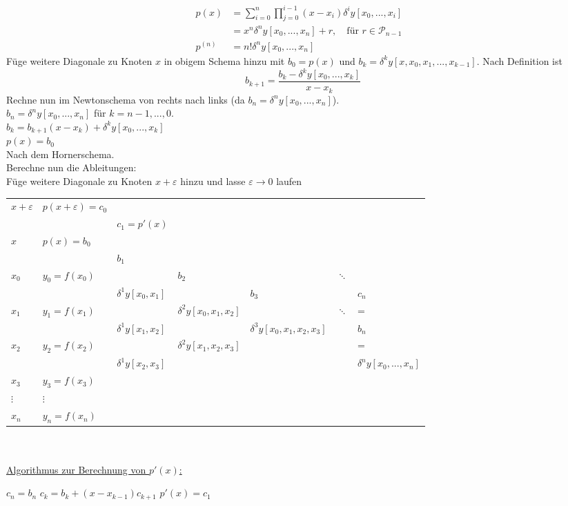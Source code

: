 \documentclass[12pt]{article}
\theoremstyle{break}
\begin{document}
\begin{description}
\begin{align*}
    p(x) &= \sum_{i=0}^n \prod_{j=0}^{i-1} (x-x_i) \delta^iy[x_0,..., x_i] &\\
    &= x^n \delta^ny[x_0,..., x_n] + r, \quad \text{für }r \in \mathcal{P}_{n-1} &\\
    p^{(n)} &= n! \delta^ny[x_0,..., x_n]
  \end{align*}
  Füge weitere Diagonale zu Knoten $x$ in obigem Schema hinzu mit $b_0 = p(x)$ und $b_k = \delta^k y[x, x_0, x_1, ..., x_{k-1}]$. Nach Definition ist 
  $$b_{k+1} = \frac{b_k - \delta^ky[x_0,..., x_k]}{x-x_k}$$
  Rechne nun im Newtonschema von rechts nach links (da $b_n = \delta^ny[x_0,..., x_n]$).\\
  $b_n = \delta^ny[x_0,...,x_n]$ für $k= n-1, ..., 0$.\\
  $b_k = b_{k+1} (x-x_k) + \delta^ky[x_0,...,x_k]$ \\
  $p(x) = b_0$\\
  Nach dem Hornerschema.\\
  Berechne nun die Ableitungen: \\
  Füge weitere Diagonale zu Knoten $x+ \varepsilon$ hinzu und lasse $\varepsilon \rightarrow 0$ laufen \\
  \begin{tabular}{lllllll}
    $x+ \varepsilon$ & $p(x + \varepsilon) = c_0$ \\
    && $c_1 = p'(x)$ \\
    $x$ & $p(x) = b_0$ \\
    &&$b_1$\\
	$x_0$ & $y_0 = f(x_0)$ && $b_2$&&$\ddots$\\
	 & & $\delta^1y[x_0, x_1]$&& $b_3$&&$c_n$\\
	$x_1$ & $y_1 = f(x_1)$ & &$\delta^2y[x_0, x_1, x_2]$  &&$\ddots$ & =\\
	 & & $\delta^1y[x_1, x_2]$ & & $\delta^3y[x_0, x_1, x_2, x_3]$&& $b_n$\\
	$x_2$ & $y_2 = f(x_2)$ & & $\delta^2y[x_1, x_2, x_3]$&&& =\\
	 & & $\delta^1y[x_2, x_3]$&&&& $\delta^ny[x_0,...,x_n]$\\
	$x_3$ & $y_3 = f(x_3)$ \\
	$\vdots$ & $\vdots$\\
	$x_n$ & $y_n = f(x_n)$
  \end{tabular}\\\\
  \underline{Algorithmus zur Berechnung von $p'(x)$:}
  \begin{algorithmic}
  \STATE $c_n = b_n$
  	\STATE $c_k = b_k + (x-x_{k-1})c_{k+1}$
  \ENDFOR
  \STATE $p'(x) = c_1$
  \end{algorithmic}
\end{description}
\end{document}
